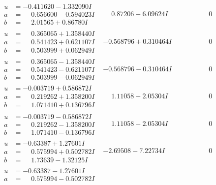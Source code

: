 \documentclass[1p]{elsarticle_modified}
\theoremstyle{definition}
\begin{document}
$$\begin{array}{c|c|c}
 \hline 
\begin{aligned}
u &= -0.411620 - 1.332090 I \\
a &= \phantom{-}0.656600 - 0.594023 I \\
b &= \phantom{-}2.01565 + 0.86780 I\end{aligned}
 & \phantom{-}0.87206 + 6.09624 I & \phantom{-0.000000 } 0 \\ \hline\begin{aligned}
u &= \phantom{-}0.365065 + 1.358440 I \\
a &= \phantom{-}0.541423 + 0.621107 I \\
b &= \phantom{-}0.503999 + 0.062949 I\end{aligned}
 & -0.568796 + 0.310464 I & \phantom{-0.000000 } 0 \\ \hline\begin{aligned}
u &= \phantom{-}0.365065 - 1.358440 I \\
a &= \phantom{-}0.541423 - 0.621107 I \\
b &= \phantom{-}0.503999 - 0.062949 I\end{aligned}
 & -0.568796 - 0.310464 I & \phantom{-0.000000 } 0 \\ \hline\begin{aligned}
u &= -0.003719 + 0.586872 I \\
a &= \phantom{-}0.219262 + 1.358200 I \\
b &= \phantom{-}1.071410 + 0.136796 I\end{aligned}
 & \phantom{-}1.11058 + 2.05304 I & \phantom{-0.000000 } 0 \\ \hline\begin{aligned}
u &= -0.003719 - 0.586872 I \\
a &= \phantom{-}0.219262 - 1.358200 I \\
b &= \phantom{-}1.071410 - 0.136796 I\end{aligned}
 & \phantom{-}1.11058 - 2.05304 I & \phantom{-0.000000 } 0 \\ \hline\begin{aligned}
u &= -0.63387 + 1.27601 I \\
a &= \phantom{-}0.575994 + 0.502782 I \\
b &= \phantom{-}1.73639 - 1.32125 I\end{aligned}
 & -2.69508 - 7.22734 I & \phantom{-0.000000 } 0 \\ \hline\begin{aligned}
u &= -0.63387 - 1.27601 I \\
a &= \phantom{-}0.575994 - 0.502782 I \\

\end{aligned}
\end{array}$$
\end{document}
